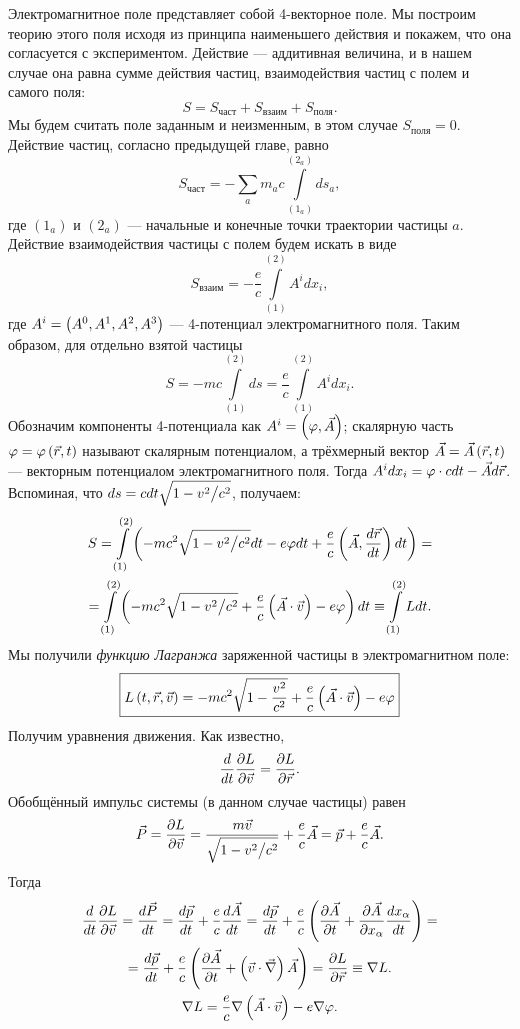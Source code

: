    Электромагнитное поле представляет собой 4-векторное поле. Мы построим теорию этого поля исходя из принципа наименьшего действия и покажем, что она согласуется с
    экспериментом. Действие --- аддитивная величина, и в нашем случае она равна сумме действия частиц, взаимодействия частиц с полем и самого поля:
    \[
        S = S_{\textrm{част}} + S_{\textrm{взаим}} + S_{\textrm{поля}}.
    \]
    Мы будем считать поле заданным и неизменным, в этом случае $S_{\textrm{поля}} = 0$. Действие частиц, согласно предыдущей главе, равно
    \[
        S_{\textrm{част}} = -\sum_a m_a c \int\limits_{(1_a)}^{(2_a)}ds_a,
    \]
    где $(1_a)$ и $(2_a)$ --- начальные и конечные точки траектории частицы $a$. Действие взаимодействия частицы с полем будем искать в виде
    \[
        S_{\textrm{взаим}} = -\frac{e}{c}\int\limits_{(1)}^{(2)}A^idx_i,
    \]
    где $A^i = \left({A^0, A^1, A^2, A^3}\right)$ --- 4-потенциал электромагнитного поля. Таким образом, для отдельно взятой частицы
    \[
        S = -mc\int\limits_{(1)}^{(2)}ds = \frac{e}{c}\int\limits_{(1)}^{(2)}A^idx_i.
    \]
    Обозначим компоненты 4-потенциала как $A^i = \left({\varphi, \vec{A}}\right)$; скалярную часть $\varphi = \varphi\left({\vec{r}, t}\right)$ называют
    скалярным потенциалом, а трёхмерный вектор $\vec{A} = \vec{A}\left({\vec{r}, t}\right) $ --- векторным потенциалом электромагнитного поля.
    Тогда $A^idx_i = \varphi\cdot cdt - \vec{A}d\vec{r}$. Вспоминая, что $ds = cdt\sqrt{1 - v^2 \big/ c^2}$, получаем:
    \begin{gather*}
        S = \int\limits_{(1)}^{(2)}\left({-mc^2\sqrt{1 - v^2 \big/ c^2} dt - e\varphi dt + \frac{e}{c}\left({\vec{A}, \frac{d\vec{r}}{dt}}\right)dt}\right) = \\
        = \int\limits_{(1)}^{(2)}\left({-mc^2\sqrt{1 - v^2 \big/ c^2} + \frac{e}{c}\left({\vec{A}\cdot\vec{v}}\right) - e\varphi}\right)dt \equiv \int\limits_{(1)}^{(2)}Ldt.
    \end{gather*}
    Мы получили \textit{функцию Лагранжа} заряженной частицы в электромагнитном поле:
    \[
        \boxed{L\left({t, \vec{r}, \vec{v}}\right) = -mc^2\sqrt{1 - \frac{v^2}{c^2}} + \frac{e}{c}\left({\vec{A}\cdot\vec{v}}\right) - e\varphi}
    \]
    Получим уравнения движения. Как известно,
    \[
        \frac{d}{dt}\frac{\partial L}{\partial\vec{v}} = \frac{\partial L}{\partial\vec{r}}.
    \]
    Обобщённый импульс системы (в данном случае частицы) равен
    \[
        \vec{P} = \frac{\partial L}{\partial\vec{v}} = \frac{m\vec{v}}{\sqrt{1 - v^2 \big/ c^2}} + \frac{e}{c}\vec{A} = \vec{p} + \frac{e}{c}\vec{A}.
    \]
    Тогда
    \begin{gather*}
        \frac{d}{dt}\frac{\partial L}{\partial\vec{v}} = \frac{d\vec{P}}{dt} = \frac{d\vec{p}}{dt} + \frac{e}{c}\frac{d\vec{A}}{dt} = 
        \frac{d\vec{p}}{dt} + \frac{e}{c}\left({\frac{\partial\vec{A}}{\partial t} + \frac{\partial\vec{A}}{\partial x_{\alpha}}\frac{dx_{\alpha}}{dt}}\right) = \\
        = \frac{d\vec{p}}{dt} + \frac{e}{c}\left({\frac{\partial\vec{A}}{\partial t} + \left({\vec{v}\cdot\vec{\nabla}}\right)\vec{A}}\right) = \frac{\partial L}{\partial\vec{r}} \equiv \nabla L. \\
        \nabla L = \frac{e}{c}\nabla\left({\vec{A}\cdot\vec{v}}\right) - e\nabla\varphi.
    \end{gather*}
